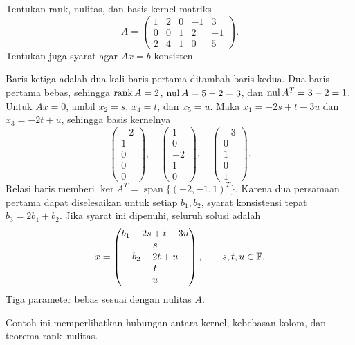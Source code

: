 \begin{exam}
    Tentukan rank, nulitas, dan basis kernel matriks
    \[
        A=\begin{pmatrix}
            1&2&0&-1&3\\0&0&1&2&-1\\2&4&1&0&5
        \end{pmatrix}.
    \]
    Tentukan juga syarat agar $Ax=b$ konsisten.
\end{exam}
\begin{solution}
    Baris ketiga adalah dua kali baris pertama ditambah baris kedua.
    Dua baris pertama bebas, sehingga $\operatorname{rank} A=2$, $\operatorname{nul} A=5-2=3$,
    dan $\operatorname{nul} A^T=3-2=1$.
    Untuk $Ax=0$, ambil $x_2=s$, $x_4=t$, dan $x_5=u$.
    Maka $x_1=-2s+t-3u$ dan $x_3=-2t+u$, sehingga basis kernelnya
    \[
        \begin{pmatrix}-2\\1\\0\\0\\0\end{pmatrix},\quad
        \begin{pmatrix}1\\0\\-2\\1\\0\end{pmatrix},\quad
        \begin{pmatrix}-3\\0\\1\\0\\1\end{pmatrix}.
    \]
    Relasi baris memberi $\ker A^T=\operatorname{span}\{(-2,-1,1)^T\}$.
    Karena dua persamaan pertama dapat diselesaikan untuk setiap
    $b_1,b_2$, syarat konsistensi tepat $b_3=2b_1+b_2$.
    Jika syarat ini dipenuhi, seluruh solusi adalah
    \[
        x=\begin{pmatrix}b_1-2s+t-3u\\s\\b_2-2t+u\\t\\u\end{pmatrix},
        \qquad s,t,u\in\mathbb{F}.
    \]
    Tiga parameter bebas sesuai dengan nulitas $A$.
\end{solution}

Contoh ini memperlihatkan hubungan antara kernel, kebebasan kolom,
dan teorema rank--nulitas.


